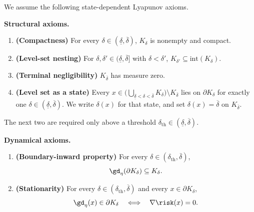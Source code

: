 \documentclass{article}
\begin{document}
We assume the following state-dependent Lyapunov axioms.

\textbf{Structural axioms.}
\begin{enumerate}[label=(A\arabic*), ref=A\arabic*]
    \item \label{cond:P_is_pd}
    \textbf{(Compactness)}
    For every $\delta \in (\underline\delta, \overline\delta)$, $K_\delta$ is
    nonempty and compact.

    \item \label{cond:nesting}
    \textbf{(Level-set nesting)}
    For $\delta, \delta' \in (\underline\delta, \overline\delta]$ with
    $\delta < \delta'$, $K_{\delta'} \subseteq \mathrm{int}(K_\delta)$.

    \item \label{cond:end_point_measure_zero}
    \textbf{(Terminal negligibility)}
    $K_{\overline\delta}$ has measure zero.

    \item \label{cond:level_set_as_state}
    \textbf{(Level set as a state)}
    Every
    $x\in\bigl(\bigcup_{\underline\delta<\delta<\overline\delta}K_\delta\bigr)
    \setminus K_{\overline\delta}$
    lies on $\partial K_\delta$ for exactly one
    $\delta\in(\underline\delta,\overline\delta)$. We write $\delta(x)$ for
    that state, and set $\delta(x)=\overline\delta$ on $K_{\overline\delta}$.
\end{enumerate}

The next two are required only above a threshold
$\delta_{\mathrm{th}}\in(\underline\delta,\overline\delta)$.

\textbf{Dynamical axioms.}
\begin{enumerate}[label=(A\arabic*), ref=A\arabic*, start=5]
    \item \label{cond:monotonicity}
    \textbf{(Boundary-inward property)}
    For every $\delta \in (\delta_{\mathrm{th}}, \overline\delta)$,
    \begin{align}
        \gd_\eta(\partial K_\delta)\subseteq K_\delta.
    \end{align}

    \item \label{cond:stationarity}
    \textbf{(Stationarity)}
    For every $\delta \in (\delta_{\mathrm{th}}, \overline\delta)$ and every
    $x\in\partial K_\delta$,
    \begin{align}
        \gd_\eta(x)\in\partial K_\delta
        \quad\Longleftrightarrow\quad
        \nabla\risk(x)=0.
    \end{align}
\end{enumerate}
\end{document}
